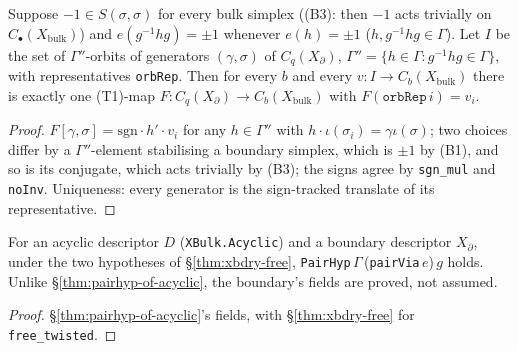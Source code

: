 \begin{theorem}\label{thm:xbdry-free}
  \leanok
  Suppose $-1\in S(\sigma,\sigma)$ for every bulk simplex ((B3): then $-1$ acts trivially on $C_\bullet(X_{\mathrm{bulk}})$) and
  $e(g^{-1}hg)=\pm1$ whenever $e(h)=\pm1$ ($h,g^{-1}hg\in\Gamma$). Let $I$ be the set of $\Gamma''$-orbits of generators
  $(\gamma,\sigma)$ of $C_q(X_\partial)$, $\Gamma''=\{h\in\Gamma: g^{-1}hg\in\Gamma\}$, with representatives \texttt{orbRep}. Then for
  every $b$ and every $v\colon I\to C_b(X_{\mathrm{bulk}})$ there is exactly one (T1)-map $F\colon C_q(X_\partial)\to C_b(X_{\mathrm{bulk}})$
  with $F(\texttt{orbRep}\,i)=v_i$.
\end{theorem}
\begin{proof}
  \leanok
  $F[\gamma,\sigma]=\mathrm{sgn}\cdot h'\cdot v_i$ for any $h\in\Gamma''$ with $h\cdot\iota(\sigma_i)=\gamma\iota(\sigma)$; two choices differ by
  a $\Gamma''$-element stabilising a boundary simplex, which is $\pm1$ by (B1), and so is its conjugate, which acts trivially
  by (B3); the signs agree by \texttt{sgn\_mul} and \texttt{noInv}. Uniqueness: every generator is the sign-tracked translate
  of its representative.
\end{proof}

\begin{theorem}\label{thm:pairhyp-xbdry}
  \leanok
  For an acyclic descriptor $D$ (\texttt{XBulk.Acyclic}) and a boundary descriptor $X_\partial$, under the two hypotheses of
  \S\ref{thm:xbdry-free}, \texttt{PairHyp}\,$\Gamma$\,(\texttt{pairVia}\,$e$)\,$g$ holds. Unlike \S\ref{thm:pairhyp-of-acyclic}, the
  boundary's fields are proved, not assumed.
\end{theorem}
\begin{proof}
  \leanok
  \S\ref{thm:pairhyp-of-acyclic}'s fields, with \S\ref{thm:xbdry-free} for \texttt{free\_twisted}.
\end{proof}

